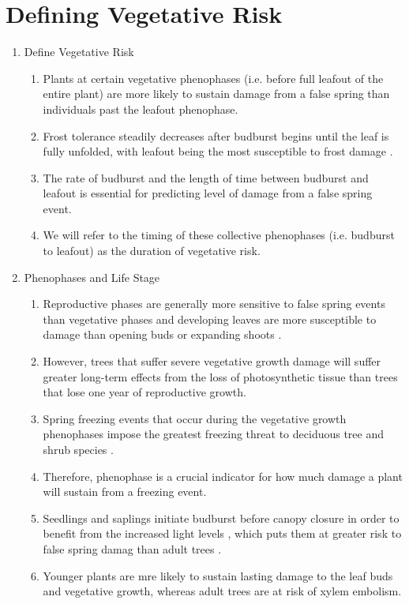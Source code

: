 \documentclass{article}\usepackage[]{graphicx}\usepackage[]{color}
\begin{document}
\section*{Defining Vegetative Risk}
\begin{enumerate}
\item Define Vegetative Risk
\begin {enumerate}
\item Plants at certain vegetative phenophases (i.e. before full leafout of the entire plant) are more likely to sustain damage from a false spring than individuals past the leafout phenophase. 
\item Frost tolerance steadily decreases after budburst begins until the leaf is fully unfolded, with leafout being the most susceptible to frost damage \citep {Lenz2016}.
\item The rate of budburst and the length of time between budburst and leafout is essential for predicting level of damage from a false spring event.
\item We will refer to the timing of these collective phenophases (i.e. budburst to leafout) as the duration of vegetative risk.
\end {enumerate}
\item Phenophases and Life Stage
\begin {enumerate}
\item Reproductive phases are generally more sensitive to false spring events than vegetative phases and developing leaves are more susceptible to damage than opening buds or expanding shoots \citep{Augspurger2009, Lenz2013}.
\item However, trees that suffer severe vegetative growth damage will suffer greater long-term effects from the loss of photosynthetic tissue than trees that lose one year of reproductive growth. 
\item Spring freezing events that occur during the vegetative growth phenophases impose the greatest freezing threat to deciduous tree and shrub species \citep{Sakai1987}.
\item Therefore, phenophase is a crucial indicator for how much damage a plant will sustain from a freezing event.
\item Seedlings and saplings initiate budburst before canopy closure in order to benefit from the increased light levels \citep {Augspurger2008}, which puts them at greater risk to false spring damag than adult trees \citep{Vitasse2014}.
\item Younger plants are mre likely to sustain lasting damage to the leaf buds and vegetative growth, whereas adult trees are at risk of xylem embolism.

\end{enumerate}
\end{enumerate}
\end{document}
